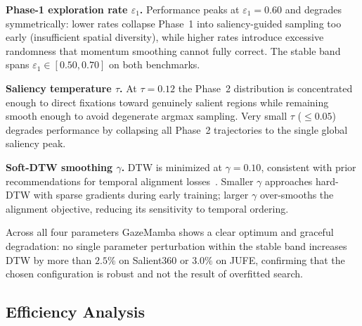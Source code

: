 \documentclass[sigconf]{acmart}
\begin{document}
\textbf{Phase-1 exploration rate $\varepsilon_1$.}
Performance peaks at $\varepsilon_1{=}0.60$ and degrades symmetrically:
lower rates collapse Phase~1 into saliency-guided sampling too early
(insufficient spatial diversity), while higher rates introduce excessive
randomness that momentum smoothing cannot fully correct.
The stable band spans $\varepsilon_1 \in [0.50, 0.70]$ on both benchmarks.

\textbf{Saliency temperature $\tau$.}
At $\tau{=}0.12$ the Phase~2 distribution is concentrated enough to direct
fixations toward genuinely salient regions while remaining smooth enough to
avoid degenerate argmax sampling.
Very small $\tau$ ($\leq 0.05$) degrades performance by collapsing all
Phase~2 trajectories to the single global saliency peak.

\textbf{Soft-DTW smoothing $\gamma$.}
DTW is minimized at $\gamma{=}0.10$, consistent with prior recommendations
for temporal alignment losses~\cite{cuturi2017soft}.
Smaller $\gamma$ approaches hard-DTW with sparse gradients during early
training; larger $\gamma$ over-smooths the alignment objective, reducing
its sensitivity to temporal ordering.

Across all four parameters GazeMamba shows a clear optimum and graceful
degradation: no single parameter perturbation within the stable band increases
DTW by more than $2.5\%$ on Salient360 or $3.0\%$ on JUFE, confirming that
the chosen configuration is robust and not the result of overfitted search.

\subsection{Efficiency Analysis}
\end{document}
